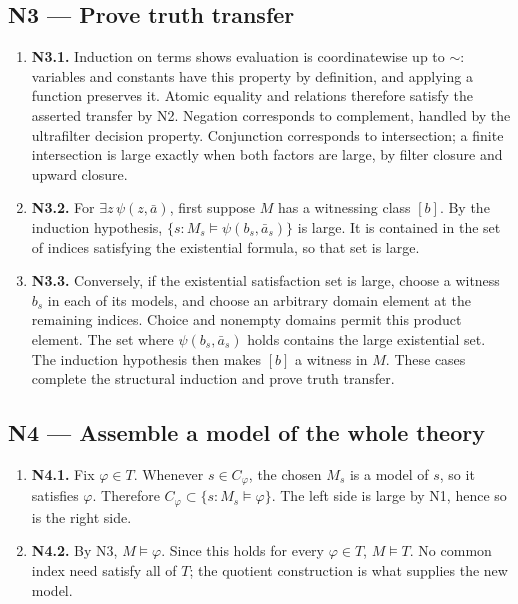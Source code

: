 \documentclass[preprint,12pt,aps,pra,showkeys,amsmath,amssymb,superscriptaddress,floatfix]{revtex4-2}
\theoremstyle{definition}
\theoremstyle{remark}
\begin{document}
\subsection{N3 --- Prove truth transfer}\label{n3-prove-truth-transfer}

\begin{enumerate}
\def\labelenumi{\arabic{enumi}.}
\item
  \textbf{N3.1.} Induction on terms shows evaluation is coordinatewise
  up to \(\sim\): variables and constants have this property by
  definition, and applying a function preserves it. Atomic equality and
  relations therefore satisfy the asserted transfer by N2. Negation
  corresponds to complement, handled by the ultrafilter decision
  property. Conjunction corresponds to intersection; a finite
  intersection is large exactly when both factors are large, by filter
  closure and upward closure.
\item
  \textbf{N3.2.} For \(\exists z\,\psi(z,\bar a)\), first suppose \(M\)
  has a witnessing class \([b]\). By the induction hypothesis,
  \(\{s:M_s\models\psi(b_s,\bar a_s)\}\) is large. It is contained in
  the set of indices satisfying the existential formula, so that set is
  large.
\item
  \textbf{N3.3.} Conversely, if the existential satisfaction set is
  large, choose a witness \(b_s\) in each of its models, and choose an
  arbitrary domain element at the remaining indices. Choice and nonempty
  domains permit this product element. The set where
  \(\psi(b_s,\bar a_s)\) holds contains the large existential set. The
  induction hypothesis then makes \([b]\) a witness in \(M\). These
  cases complete the structural induction and prove truth transfer.
\end{enumerate}

\subsection{N4 --- Assemble a model of the whole
theory}\label{n4-assemble-a-model-of-the-whole-theory}

\begin{enumerate}
\def\labelenumi{\arabic{enumi}.}
\item
  \textbf{N4.1.} Fix \(\varphi\in T\). Whenever \(s\in C_\varphi\), the
  chosen \(M_s\) is a model of \(s\), so it satisfies \(\varphi\).
  Therefore \(C_\varphi\subset\{s:M_s\models\varphi\}\). The left side
  is large by N1, hence so is the right side.
\item
  \textbf{N4.2.} By N3, \(M\models\varphi\). Since this holds for every
  \(\varphi\in T\), \(M\models T\). No common index need satisfy all of
  \(T\); the quotient construction is what supplies the new model.
\end{enumerate}
\end{document}
